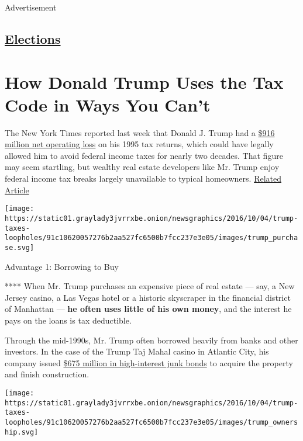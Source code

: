 Advertisement

\hypertarget{-elections-}{%
\subsection{\texorpdfstring{ \href{/news-event/2020-election}{Elections}
}{ Elections }}\label{-elections-}}

\hypertarget{how-donald-trump-uses-the-tax-code-in-ways-you-cant}{%
\section{How Donald Trump Uses the Tax Code in Ways You
Can't}\label{how-donald-trump-uses-the-tax-code-in-ways-you-cant}}

The New York Times reported last week that Donald J. Trump had a
\href{http://www.nytimes3xbfgragh.onion/2016/10/02/us/politics/donald-trump-taxes.html}{\$916
million net operating loss} on his 1995 tax returns, which could have
legally allowed him to avoid federal income taxes for nearly two
decades. That figure may seem startling, but wealthy real estate
developers like Mr. Trump enjoy federal income tax breaks largely
unavailable to typical homeowners.
\href{https://www.nytimes3xbfgragh.onion/2016/10/02/us/politics/donald-trump-taxes.html}{Related
Article}

\texttt{[image: https://static01.graylady3jvrrxbe.onion/newsgraphics/2016/10/04/trump-taxes-loopholes/91c10620057276b2aa527fc6500b7fcc237e3e05/images/trump\_purchase.svg]}

Advantage 1: Borrowing to Buy

**** When Mr. Trump purchases an expensive piece of real estate --- say,
a New Jersey casino, a Las Vegas hotel or a historic skyscraper in the
financial district of Manhattan --- \textbf{he often uses little of his
own money}, and the interest he pays on the loans is tax deductible.

Through the mid-1990s, Mr. Trump often borrowed heavily from banks and
other investors. In the case of the Trump Taj Mahal casino in Atlantic
City, his company issued
\href{http://www.nytimes3xbfgragh.onion/2016/06/12/nyregion/donald-trump-atlantic-city.html}{\$675
million in high-interest junk bonds} to acquire the property and finish
construction.

\texttt{[image: https://static01.graylady3jvrrxbe.onion/newsgraphics/2016/10/04/trump-taxes-loopholes/91c10620057276b2aa527fc6500b7fcc237e3e05/images/trump\_ownership.svg]}

